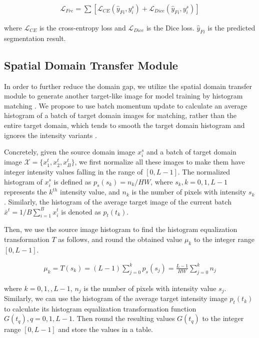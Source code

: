 \documentclass[letterpaper]{article} %
\begin{document}
{\small
\begin{align}
    \mathcal{L}_{Fre}=\sum \left[ \mathcal{L}_{CE} \left(\hat{y}_{Fi},y_i^s\right)+ \mathcal{L}_{Dice} \left(\hat{y}_{Fi},y_i^s\right) \right]
    \label{eq2}
\end{align}
}

\noindent
where $\mathcal{L}_{CE}$ is the cross-entropy loss and $\mathcal{L}_{Dice}$ is the Dice loss. $\hat{y}_{Fi}$ is the predicted segmentation result.

\subsection{Spatial Domain Transfer Module}
In order to further reduce the domain gap, we utilize the spatial domain transfer module to generate another
target-like image for model training by histogram matching \cite{35}. We propose to use batch momentum update to
calculate an average histogram of a batch of target domain images for matching, rather than the entire target
domain, which tends to smooth the target domain histogram and ignores the intensity variants \cite{36}.

Concretely, given the source domain image $x_i^s$ and a batch of target domain image $\mathcal{X}=\{x_1^t,x_2^t,x_B^t\}$,
we first normalize all these images to make them have integer intensity values falling in the range of $[0,L-1]$.
The normalized histogram of $x_i^s$ is defined as $p_s(s_k)=n_k/{HW}$, where  $s_k,k=0,1,L-1$ represents the $k^{th}$
intensity value, and $n_k$ is the number of pixels with intensity $s_k$. Similarly, the histogram of the average target
image of the current batch $\bar{x}^t  =1/B \sum_{i=1}^{B}x_i^t$  is denoted as $p_t(t_k)$.

Then, we use the source image histogram to find the histogram equalization transformation $T$ as follows, and
round the obtained value ${\mu}_k$ to the integer range $[0,L-1]$.

{\small
\begin{align}
    {\mu}_k=T\left(s_k\right)=\left(L-1\right) \sum_{j=0}^{k}{p_s(s_j)}=\frac{L-1}{HW}\sum_{j=0}^{k}{n_j}\label{eq3}
\end{align}
}

\noindent
where $k=0,1,,L-1$, $n_j$ is the number of pixels with intensity value $s_j$.
Similarly, we can use the histogram of the average target intensity image $p_t(t_k)$ to calculate its histogram
equalization transformation function $G(t_q),q=0,1,L-1$. Then round the resulting values $G(t_q)$ to the integer range
$[0,L-1]$ and store the values in a table.
\end{document}
